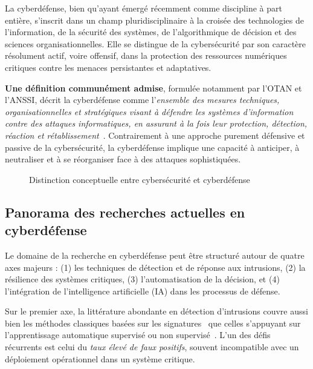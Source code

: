 \documentclass[ twoside,openright,titlepage,numbers=noenddot,headinclude,%
                footinclude=true,cleardoublepage=empty,abstractoff, %
                BCOR=5mm,paper=a4,fontsize=11pt,%
                french,american,%
                ]{scrreprt}
\begin{document}
La cyberdéfense, bien qu'ayant émergé récemment comme discipline à part entière, s'inscrit dans un champ pluridisciplinaire à la croisée des technologies de l'information, de la sécurité des systèmes, de l'algorithmique de décision et des sciences organisationnelles. Elle se distingue de la cybersécurité par son caractère résolument actif, voire offensif, dans la protection des ressources numériques critiques contre les menaces persistantes et adaptatives.

\textbf{Une définition communément admise}, formulée notamment par l'OTAN et l'ANSSI, décrit la cyberdéfense comme l'\emph{ensemble des mesures techniques, organisationnelles et stratégiques visant à défendre les systèmes d'information contre des attaques informatiques, en assurant à la fois leur protection, détection, réaction et rétablissement}~\cite{nato2019, anssi2020}. Contrairement à une approche purement défensive et passive de la cybersécurité, la cyberdéfense implique une capacité à anticiper, à neutraliser et à se réorganiser face à des attaques sophistiquées.

\begin{figure}[h]
    \centering
    \caption{Distinction conceptuelle entre cybersécurité et cyberdéfense}
    \label{fig:cybersecurity_vs_cyberdefense}
\end{figure}

\subsection*{Panorama des recherches actuelles en cyberdéfense}

Le domaine de la recherche en cyberdéfense peut être structuré autour de quatre axes majeurs : (1) les techniques de détection et de réponse aux intrusions, (2) la résilience des systèmes critiques, (3) l'automatisation de la décision, et (4) l'intégration de l'intelligence artificielle (IA) dans les processus de défense.

Sur le premier axe, la littérature abondante en détection d'intrusions couvre aussi bien les méthodes classiques basées sur les signatures~\cite{axelsson2000} que celles s'appuyant sur l'apprentissage automatique supervisé ou non supervisé~\cite{sommer2010}. L'un des défis récurrents est celui du \emph{taux élevé de faux positifs}, souvent incompatible avec un déploiement opérationnel dans un système critique.
\end{document}
